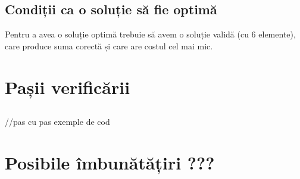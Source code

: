     \subsection{Condiții ca o soluție să fie optimă}
    Pentru a avea o soluție optimă trebuie să avem o soluție validă (cu 6 elemente), care produce suma corectă și care are costul cel mai mic.
   
\section{Pașii verificării}
    \subsection{}
    //pas cu pas exemple de cod
    
\section{Posibile îmbunătățiri ???}


